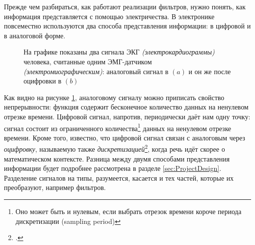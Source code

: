 \documentclass[a4paper, 10pt, final]{article} %
\newcommand{\parenciteit}[2]{\textit{\parencite[#1]{#2}}} %
\begin{document}
    Прежде чем разбираться, как работают реализации фильтров, нужно понять, как информация представляется с помощью электричества.
    В электронике повсеместно используются два способа представления информации: в цифровой и в аналоговой форме.
    \begin{figure}[H]
        \centering
        \caption{На графике показаны два сигнала ЭКГ \emph{(электрокардиограммы)} человека, считанные одним ЭМГ-датчиком \emph{(электромиографическим)}: аналоговый сигнал в $(a)$ и он же после оцифровки в $(b)$ \parenciteit{}{ECGDataThesis}\parenciteit{}{ECGData}}
        \label{fig:AnalogDigital}
    \end{figure}

    Как видно на рисунке \ref{fig:AnalogDigital}, аналоговому сигналу можно приписать свойство непрерывности: функция содержит бесконечное количество данных на ненулевом отрезке времени.
    Цифровой сигнал, напротив, периодически даёт нам одну точку: сигнал состоит из ограниченного количества\footnote{Оно может быть и нулевым, если выбрать отрезок времени короче периода дискретизации (sampling period)} данных на ненулевом отрезке времени.
    Кроме того, известно, что цифровой сигнал связан с аналоговым через \emph{оцифровку}, называемую также \emph{дискретизацией}\footcite[«Процесс перевода непрерывных функций, моделей, переменных и уравнений в их дискретные аналоги»]{Discretization:Wiki}, когда речь идёт скорее о математическом контексте.
    Разница между двумя способами представления информации будет подробнее рассмотрена в разделе \ref{sec:ProjectDesign}.
    Разделение сигналов на типы, разумеется, касается и тех частей, которые их преобразуют, например фильтров.
\end{document}
